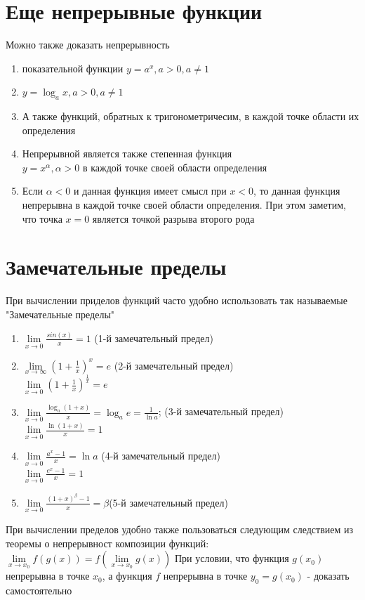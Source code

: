 \documentclass[oneside]{book}
\begin{document}
\begin{enumerate}
\section{Еще непрерывные функции}
Можно также доказать непрерывность
\begin{enumerate}
\item показательной функции $y=a^x, a>0, a \neq 1$
\item $y = \log_a x, a>0, a \neq 1$
\item А также функций, обратных к тригонометричесим, в каждой точке области их определения
\item Непрерывной является также степенная функция \\ $y=x^\alpha, \alpha > 0$ в каждой точке своей области определения
\item Если $\alpha < 0$ и данная функция имеет смысл при $x < 0$, то данная функция непрерывна в каждой точке своей области определения. При этом заметим, что точка $x=0$ является точкой разрыва второго рода
\end{enumerate}
\section{Замечательные пределы}
При вычислении приделов функций часто удобно использовать так называемые "Замечательные пределы"
\begin {enumerate}
\item $\lim\limits_{x\rightarrow 0}\frac{sin(x)}{x}=1$ (1-й замечательный предел)
\item $\lim\limits_{x\rightarrow \infty}(1+\frac{1}{x})^x=e$ (2-й замечательный предел)\\
$\lim\limits_{x\rightarrow 0}(1+\frac{1}{x})^{\frac{1}{x}}=e$
\item$\lim\limits_{x\rightarrow 0}\frac{\log_a(1+x)}{x}=\log_ae=\frac{1}{\ln a}$; (3-й замечательный предел)
 \\ $\lim\limits_{x\rightarrow 0}\frac{\ln(1+x)}{x}=1$ 
\item $\lim\limits_{x\rightarrow 0}\frac{a^x-1}{x}=\ln a$ (4-й замечательный предел)\\
$\lim\limits_{x\rightarrow 0}\frac{e^x-1}{x}=1$
\item $\lim\limits_{x\rightarrow 0}\frac{(1+x)^\beta-1}{x}=\beta$(5-й замечательный предел)
\end{enumerate}
При вычислении пределов удобно также пользоваться следующим следствием из теоремы о непрерывност композиции функций:\\
$\lim \limits_{x\rightarrow x_0}f(g(x))=f(\lim \limits_{x\rightarrow x_0}g(x))$
При условии, что функция $g(x_0)$ непрерывна в точке $x_0$, а функция $f$ непрерывна в точке $y_0 = g(x_0)$ - доказать самостоятельно


\end{enumerate}
\end{document}
